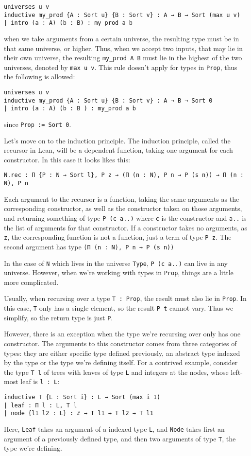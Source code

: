 \documentclass[a4paper, 12pt]{article}
\newcommand{\lean}[1]{\texttt{#1}}
\theoremstyle{changedot}
\theoremstyle{changedotbreak}
\theoremstyle{nonumberplain}
\begin{document}
\begin{verbatim}
universes u v
inductive my_prod {A : Sort u} {B : Sort v} : A → B → Sort (max u v)
| intro (a : A) (b : B) : my_prod a b
\end{verbatim}

when we take arguments from a certain universe, the resulting type must be in that same universe, or higher. Thus, when we accept two inputs, that may lie in their own universe, the resulting \lean{my_prod A B} must lie in the highest of the two universes, denoted by \lean{max u v}. This rule doesn't apply for types in \lean{Prop}, thus the following is allowed:

\begin{verbatim}
universes u v
inductive my_prod {A : Sort u} {B : Sort v} : A → B → Sort 0
| intro (a : A) (b : B ) : my_prod a b
\end{verbatim}

since \lean{Prop := Sort 0}.

Let's move on to the induction principle. The induction principle, called the recursor in Lean, will be a dependent function, taking one argument for each constructor. In this case it looks likes this:
\begin{verbatim}
N.rec : Π {P : N → Sort l}, P z → (Π (n : N), P n → P (s n)) → Π (n : N), P n
\end{verbatim}
Each argument to the recursor is a function, taking the same arguments as the corresponding constructor, as well as the constructor taken on those arguments, and returning something of type \lean{P (c a..)} where \lean{c} is the constructor and \lean{a..} is the list of arguments for that constructor. If a constructor takes no arguments, as \lean{z}, the corresponding function is not a function, just a term of type \lean{P z}. The second argument has type \lean{(Π (n : N), P n → P (s n))}

In the case of \lean{N} which lives in the universe \lean{Type}, \lean{P (c a..)} can live in any universe. However, when we're working with types in \lean{Prop}, things are a little more complicated.

Usually, when recursing over a type \lean{T : Prop}, the result must also lie in \lean{Prop}. In this case, \lean{T} only has a single element, so the result \lean{P t} cannot vary. Thus we simplify, so the return type is just \lean{P}.

However, there is an exception when the type we're recursing over only has one constructor. The arguments to this constructor comes from three categories of types: they are either specific type defined previously, an abstract type indexed by the type or the type we're defining itself. For a contrived example, consider the type \lean{T l} of trees with leaves of type \lean{L} and integers at the nodes, whose left-most leaf is \lean{l : L}:
\begin{verbatim}
inductive T {L : Sort i} : L → Sort (max i 1)
| leaf : Π l : L, T l
| node {l1 l2 : L} : ℤ → T l1 → T l2 → T l1
\end{verbatim}
Here, \lean{Leaf} takes an argument of a indexed type \lean{L}, and \lean{Node} takes first an argument of a previously defined type, and then two arguments of type \lean{T}, the type we're defining.
\end{document}
